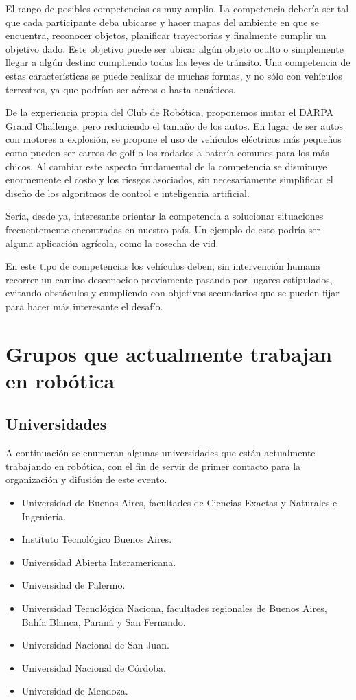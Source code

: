 \documentclass[a4paper,12pt]{article}
\begin{document}
El rango de posibles competencias es muy amplio. La competencia debería ser tal que cada participante deba ubicarse y hacer mapas del ambiente en que se encuentra, reconocer objetos, planificar trayectorias y finalmente cumplir un objetivo dado. Este objetivo puede ser ubicar algún objeto oculto o simplemente llegar a algún destino cumpliendo todas las leyes de tránsito. Una competencia de estas características se puede realizar de muchas formas, y no sólo con vehículos terrestres, ya que podrían ser aéreos o hasta acuáticos\cite{auvsi}.

De la experiencia propia del Club de Robótica\cite{club}, proponemos imitar el DARPA Grand Challenge, pero reduciendo el tamaño de los autos. En lugar de ser autos con motores a explosión, se propone el uso de vehículos eléctricos más pequeños como pueden ser carros de golf o los rodados a batería comunes para los más chicos. Al cambiar este aspecto fundamental de la competencia se disminuye enormemente el costo y los riesgos asociados, sin necesariamente simplificar el diseño de los algoritmos de control e inteligencia artificial.

Sería, desde ya, interesante orientar la competencia a solucionar situaciones frecuentemente encontradas en nuestro país. Un ejemplo de esto podría ser alguna aplicación agrícola, como la cosecha de vid\cite{wall-ye}.

En este tipo de competencias los vehículos deben, sin intervención humana recorrer un camino desconocido previamente pasando por lugares estipulados, evitando obstáculos y cumpliendo con objetivos secundarios que se pueden fijar para hacer más interesante el desafío.

\section{Grupos que actualmente trabajan en robótica}
\label{sec:grupos}

\subsection{Universidades}

A continuación se enumeran algunas universidades que están actualmente trabajando en robótica, con el fin de servir de primer contacto para la organización y difusión de este evento.

\begin{itemize}
 \item Universidad de Buenos Aires, facultades de Ciencias Exactas y Naturales e Ingeniería.
 \item Instituto Tecnológico Buenos Aires.
 \item Universidad Abierta Interamericana.
 \item Universidad de Palermo.
 \item Universidad Tecnológica Naciona, facultades regionales de Buenos Aires, Bahía Blanca, Paraná y San Fernando.
 \item Universidad Nacional de San Juan.
 \item Universidad Nacional de Córdoba.
 \item Universidad de Mendoza.
\end{itemize}
\end{document}
